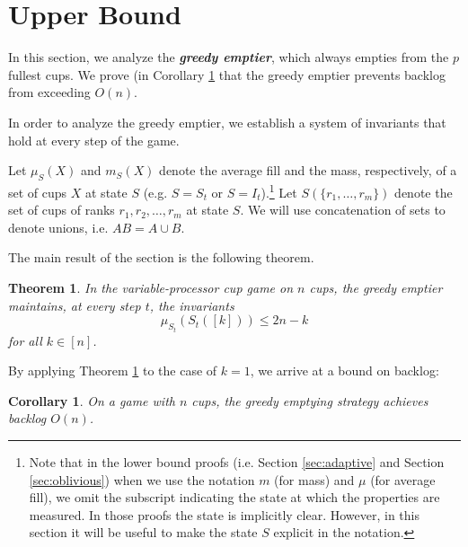 \documentclass[twocolumn]{article}[10pt]
\newcommand{\defn}[1]{{\textit{\textbf{\boldmath #1}}}\xspace}
\newtheorem{corollary}{Corollary}
\newtheorem{theorem}{Theorem}
\begin{document}
\section{Upper Bound}\label{sec:upperBound}

In this section, we analyze the \defn{greedy emptier}, which always empties
from the $p$ fullest cups. We prove (in Corollary \ref{cor:upperbound} that the
greedy emptier prevents backlog from exceeding $O(n)$. 

In order to analyze the greedy emptier, we establish a system of invariants
that hold at every step of the game. 

Let $\mu_S(X)$ and $m_S(X)$ denote the average fill and the mass, respectively,
of a set of cups $X$ at state $S$ (e.g. $S=S_t$ or $S=I_t$).\footnote{Note that
  in the lower bound proofs (i.e. Section \ref{sec:adaptive} and Section
  \ref{sec:oblivious}) when we use the notation $m$ (for mass) and $\mu$ (for
average fill), we omit the subscript indicating the state at which the
properties are measured. In those proofs the state is implicitly clear.
However, in this section it will be useful to make the state $S$ explicit in
the notation.} Let $S(\{r_1, \ldots, r_m\})$ denote the set of cups of ranks
$r_1, r_2, \ldots, r_m$ at state $S$. We will use concatenation of sets to
denote unions, i.e. $AB = A\cup B$. 

The main result of the section is the following theorem.  
\begin{theorem}
  \label{thm:invariant}
  In the variable-processor cup game on $n$ cups, the greedy emptier maintains, at every step $t$,
  the invariants
  \begin{equation}
    \label{eq:invariants}
      \mu_{S_t}(S_t([k])) \le 2n-k
  \end{equation}
  for all  $k \in [n]$.
\end{theorem}

By applying Theorem \ref{thm:invariant} to the case of $k = 1$, we arrive at a bound on backlog:
\begin{corollary}
  On a game with $n$ cups, the greedy emptying strategy achieves backlog $O(n)$.
  \label{cor:upperbound}
\end{corollary}
\end{document}
